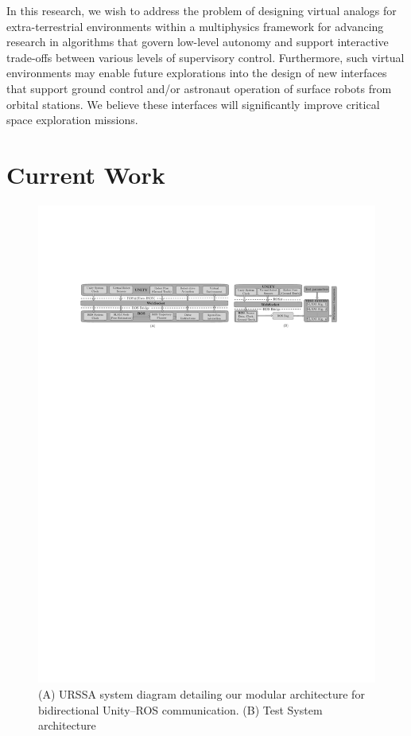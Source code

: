 \documentclass[a4paper, 10pt, conference]{ieeeconf}      %
\begin{document}
In this research, we wish to address the problem of designing virtual analogs for extra-terrestrial environments within a multiphysics framework for advancing research in algorithms that govern low-level autonomy and support interactive trade-offs between various levels of supervisory control. Furthermore, such virtual environments may enable future explorations into the design of new interfaces that support ground control and/or astronaut operation of surface robots from orbital stations. We believe these interfaces will significantly improve critical space exploration missions. 
\section{Current Work}
\begin{figure}[t]
      \centering
        \includegraphics[width=1.0\textwidth]{Figures/sysarch_test_diag.pdf}
      \caption{(A) URSSA system diagram detailing our modular architecture for bidirectional Unity--ROS communication. (B) Test System architecture}
      \vspace{-1em}
      \label{flowchart}
\end{figure}
\end{document}
